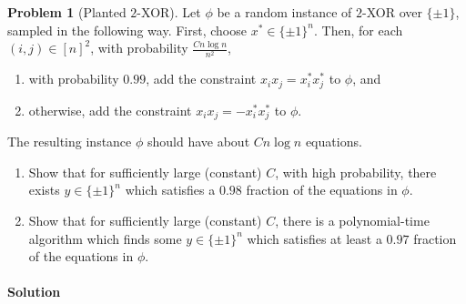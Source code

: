 \documentclass[11pt]{article}
\theoremstyle{definition}
\newtheorem{problem}[theorem]{Problem}
\begin{document}
\clearpage

\begin{problem}[Planted $2$-XOR]
  Let $\phi$ be a random instance of $2$-XOR over $\{\pm 1\}$, sampled in the following way. First, choose $x^* \in \{\pm 1\}^n$. Then, for each $(i,j) \in [n]^2$, with probability $\frac{C n \log n}{n^2}$,
  \begin{enumerate}
    \item with probability $0.99$, add the constraint $x_i x_j = x_i^* x_j^*$ to $\phi$, and
    \item otherwise, add the constraint $x_i x_j = - x_i^* x_j^*$ to $\phi$.
  \end{enumerate}
  The resulting instance $\phi$ should have about $C n \log n$ equations.
  \begin{enumerate}[label=(\alph*)]
    \item Show that for sufficiently large (constant) $C$, with high probability, there exists $y \in \{\pm 1\}^n$ which satisfies a $0.98$ fraction of the equations in $\phi$.
    \item Show that for sufficiently large (constant) $C$, there is a polynomial-time algorithm which finds some $y \in \{\pm 1\}^n$ which satisfies at least a $0.97$ fraction of the equations in $\phi$.
  \end{enumerate}
\end{problem}

\paragraph{Solution}
\end{document}
